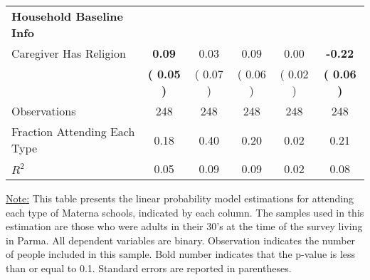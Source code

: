 \begin{table}[H]
{\begin{tabular}{lccccc}
\midrule
\textbf{Household Baseline Info} \\
\quad Caregiver Has Religion & \textbf{     0.09} &      0.03 &      0.09 &      0.00 & \textbf{    -0.22} \\
\quad  & \textbf{(     0.05 )} & (     0.07 )  & (     0.06 )  & (     0.02 ) & \textbf{(     0.06 )} \\
\midrule
Observations & 248 & 248 & 248 & 248 & 248 \\
Fraction Attending Each Type &      0.18 &      0.40 &      0.20 &      0.02 &      0.21 \\
\midrule
$ R^2$ &      0.05 &      0.09 &      0.09 &      0.02 &      0.08 \\
\bottomrule
\end{tabular}}
\end{table}
\begin{scriptsize}
\noindent\underline{Note:} This table presents the linear probability model estimations for attending each type of Materna schools, indicated by each column. The samples used in this estimation are those who were adults in their 30's at the time of the survey living in Parma. All dependent variables are binary. Observation indicates the number of people included in this sample. Bold number indicates that the p-value is less than or equal to 0.1. Standard errors are reported in parentheses.
\end{scriptsize}
